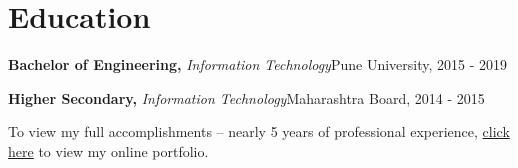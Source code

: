 \documentclass{article}
\newenvironment{education}[4]{%
  \noindent
  \textbf{#1,} \textit{#2}\hfill{#3,} {#4}%
  \par
}{\bigskip}
\begin{document}

\section*{Education}
\begin{education}{Bachelor of Engineering}{Information Technology}{Pune University}{2015 - 2019}
\end{education}
\begin{education}{Higher Secondary}{Information Technology}{Maharashtra Board}{2014 - 2015}
\end{education}

\noindent
To view my full accomplishments – nearly 5 years of professional experience, \href{https://riteshn31.github.io/}{click here} to view my online portfolio.
\end{document}
